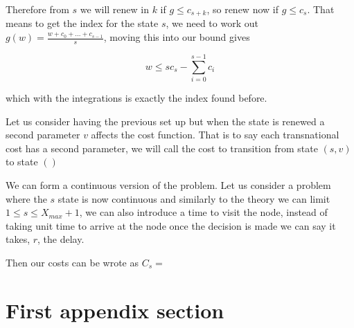 \documentclass[a4paper,10pt]{article}
\theoremstyle{definition}
\theoremstyle{definition}
\theoremstyle{remark}
\theoremstyle{definition}
\begin{document}
Therefore from $s$ we will renew in $k$ if $g \leq c_{s+k}$, so renew now if $g \leq c_{s}$. That means to get the index for the state $s$, we need to work out $g(w)=\frac{w+c_{0}+...+c_{s-1}}{s}$, moving this into our bound gives

$$w \leq s c_{s} - \sum\limits_{i=0}^{s-1} c_{i}$$

which with the integrations is exactly the index found before.

Let us consider having the previous set up but when the state is renewed a second parameter $v$ affects the cost function. That is to say each transnational cost has a second parameter, we will call the cost to transition from state $(s,v)$ to state $()$
  
  

We can form a continuous version of the problem. Let us consider a problem where the $s$ state is now continuous and similarly to the theory we can limit $1 \leq s \leq X_{max}+1$, we can also introduce a time to visit the node, instead of taking unit time to arrive at the node once the decision is made we can say it takes, $r$, the delay.

Then our costs can be wrote as $C_{s}=$




\newpage
\appendix
{}
\appendixpage
\addappheadtotoc
\section{First appendix section}
\end{document}
